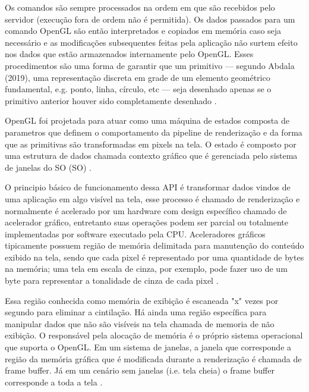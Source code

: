 Os comandos são sempre processados na ordem em que são recebidos pelo servidor (execução fora de ordem não é permitida). Os dados passados para um comando OpenGL são então interpretados e copiados em memória caso seja necessário e as modificações subsequentes feitas pela aplicação não surtem efeito nos dados que estão armazenados internamente pelo OpenGL. Esses procedimentos são uma forma de garantir que um primitivo --- segundo Abdala (2019)\nocite{abdala}, uma representação discreta em grade de um elemento geométrico fundamental, e.g. ponto, linha, círculo, etc --- seja desenhado apenas se o primitivo anterior houver sido completamente desenhado \cite{GLSLBook}.

OpenGL foi projetada para atuar como uma máquina de estados composta de parametros que definem o comportamento da pipeline de renderização e da forma que as primitivas são transformadas em pixels na tela. O estado é composto por uma estrutura de dados chamada contexto gráfico que é gerenciada pelo sistema de janelas do SO (\acrlong{SO}) \cite{GLSLBook}. 

O principio básico de funcionamento dessa API é transformar dados vindos de uma aplicação em algo visível na tela, esse processo é chamado de renderização e normalmente é acelerado por um hardware com design específico chamado de acelerador gráfico, entretanto suas operações podem ser parcial ou totalmente implementadas por software executado pela CPU. Aceleradores gráficos tipicamente possuem região de memória delimitada para manutenção do conteúdo exibido na tela, sendo que cada pixel é representado por uma quantidade de bytes na memória; uma tela em escala de cinza, por exemplo, pode fazer uso de um byte para representar a tonalidade de cinza de cada pixel \cite{GLSLBook}.

Essa região conhecida como memória de exibição é escaneada "x" vezes por segundo para eliminar a cintilação. Há ainda uma região específica para manipular dados que não são visíveis na tela chamada de memoria de não exibição. O responsável pela alocação de memória é o próprio sistema operacional que suporta o OpenGL. Em um sistema de janelas, a janela que corresponde a região da memória gráfica que é modificada durante a renderização é chamada de frame buffer. Já em um cenário sem janelas (i.e. tela cheia) o frame buffer corresponde a toda a tela \cite{GLSLBook}.

\begin{figure}[h!]
	\centering
\end{figure}
\nocite{dptbuf}

